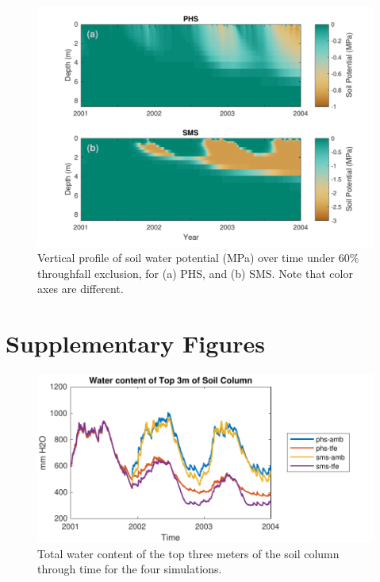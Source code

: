 \documentclass[draft,linenumbers]{agujournal}
\begin{document}
  
      \clearpage
    \begin{figure}[h]
     \centering
     \includegraphics[width=30pc]{../figs2/fig11.pdf}
     \caption{Vertical profile of soil water potential (MPa) over time under 60\% throughfall exclusion, for
     (a) PHS, and 
     (b) SMS.
     Note that color axes are different. }
     \label{fig11}
  \end{figure}


\clearpage

\appendix

\section{Supplementary Figures}

      \begin{figure}[h]
     \centering
     \includegraphics[width=30pc]{../figs2/top3m.pdf}
     \caption{Total water content of the top three meters of the soil column through time for the four simulations.}
     \label{top3m}
  \end{figure}
  \clearpage
  
\end{document}
